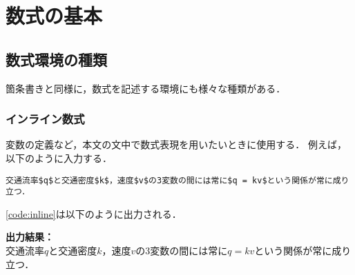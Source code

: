 \section{数式の基本}

\subsection{数式環境の種類}

箇条書きと同様に，数式を記述する環境にも様々な種類がある．



\subsubsection{インライン数式}

変数の定義など，本文の文中で数式表現を用いたいときに使用する．
例えば，以下のように入力する．
\begin{lstlisting}[caption=インライン数式,label=code:inline]
  交通流率$q$と交通密度$k$，速度$v$の3変数の間には常に$q = kv$という関係が常に成り立つ．
\end{lstlisting}
\code\ref{code:inline}は以下のように出力される．

\noindent\textbf{出力結果：}\hrulefill\\
交通流率$q$と交通密度$k$，速度$v$の3変数の間には常に$q = kv$という関係が常に成り立つ．
\\\noindent\hrulefill 

